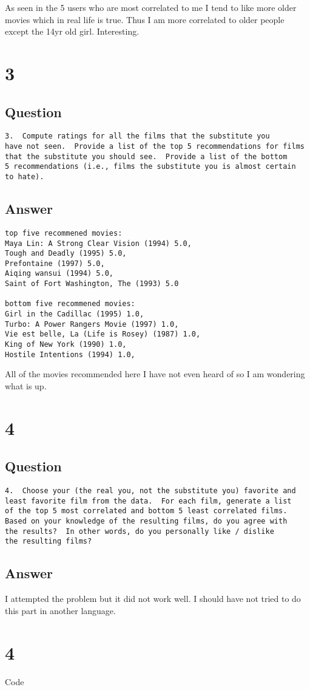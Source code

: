 \documentclass[letterpaper,10pt]{article}
\begin{document}
As seen in the 5 users who are most correlated to me I tend to like more older movies which in real life is true. Thus I am more correlated to older people except the 14yr old girl. Interesting.


\section*{3}
\subsection*{Question}
\begin{verbatim}
3.  Compute ratings for all the films that the substitute you
have not seen.  Provide a list of the top 5 recommendations for films
that the substitute you should see.  Provide a list of the bottom
5 recommendations (i.e., films the substitute you is almost certain
to hate).
\end{verbatim}
\subsection*{Answer}

\begin{verbatim}
top five recommened movies: 
Maya Lin: A Strong Clear Vision (1994) 5.0,
Tough and Deadly (1995) 5.0,
Prefontaine (1997) 5.0,
Aiqing wansui (1994) 5.0,
Saint of Fort Washington, The (1993) 5.0

bottom five recommened movies: 
Girl in the Cadillac (1995) 1.0,
Turbo: A Power Rangers Movie (1997) 1.0,
Vie est belle, La (Life is Rosey) (1987) 1.0,
King of New York (1990) 1.0,
Hostile Intentions (1994) 1.0,
\end{verbatim}
All of the movies recommended here I have not even heard of so I am wondering what is up. 

\section*{4}
\subsection*{Question}
\begin{verbatim}
4.  Choose your (the real you, not the substitute you) favorite and
least favorite film from the data.  For each film, generate a list
of the top 5 most correlated and bottom 5 least correlated films.
Based on your knowledge of the resulting films, do you agree with
the results?  In other words, do you personally like / dislike
the resulting films?
\end{verbatim}


\subsection*{Answer}
I attempted the problem but it did not work well. I should have not tried to do this part in another language.

\section*{4}
Code
  
\end{document}
